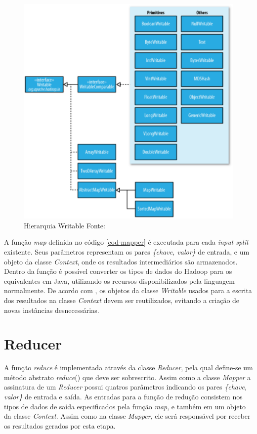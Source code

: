 \begin{figure}[ht!]
	\centering
	\includegraphics[keepaspectratio=true,scale=0.5]
	  {figuras/hadoop-writable.eps}
	\caption[Hierarquia Writable]{Hierarquia Writable
	\protect\linebreak Fonte: \cite{white2012}}
	\label{fig-writable}
\end{figure}
\FloatBarrier

A função \textit{map} definida no código \ref{cod-mapper} é executada para cada \textit{input split} existente. Seus parâmetros representam os pares \textit{\{chave, valor\}} de entrada, e um objeto da classe \textit{Context}, onde os resultados intermediários são armazenados. Dentro da função é possível converter os tipos de dados do Hadoop para os equivalentes em Java, utilizando os recursos disponibilizados pela linguagem normalmente. De acordo com , os objetos da classe \textit{Writable} usados para a escrita dos resultados na classe \textit{Context} devem ser reutilizados, evitando a criação de novas instâncias desnecessárias.

\section{Reducer}

A função \textit{reduce} é implementada através da classe \textit{Reducer}, pela qual define-se um método abstrato \textit{reduce}() que deve ser sobrescrito. Assim como a classe \textit{Mapper} a assinatura de um \textit{Reducer} possui quatros parâmetros indicando os pares \textit{\{chave, valor\}} de entrada e saída. As entradas para a função de redução consistem nos tipos de dados de saída especificados pela função \textit{map}, e também em um objeto da classe \textit{Context}. Assim como na classe \textit{Mapper}, ele será responsável por receber os resultados gerados por esta etapa. 

